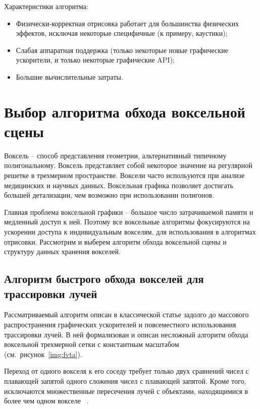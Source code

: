 
Характеристики алгоритма:
\begin{itemize}[label*=---]
     физически-корректной отрисовки не требует больших модификаций алгоритма,
        дополнительных затрат памяти;
    \item Физически-корректная отрисовка работает для большинства физических эффектов,
        исключая некоторые специфичные (к примеру, каустики);
    \item Слабая аппаратная поддержка (только некоторые новые графические ускорители, и только 
        некоторые графические API);
    \item Большие вычислительные затраты.
\end{itemize}

\section{Выбор алгоритма обхода воксельной сцены}

Воксель -- способ представления геометрии, альтернативный типичному
полигональному. Воксель представляет собой некоторое значение на регулярной решетке в 
трехмерном пространстве. Воксели часто испольуются при анализе медицинских и научных
данных. Воксельная графика позволяет достигать большей детализации,
чем возможно при использовании полигонов. 

Главная проблема воксельной графики -- большое число затрачиваемой памяти и медленный доступ к ней.
Поэтому все воксельные алгоритмы фокусируются на ускорении доступа к индивидуальным вокселям, для
использования в алгоритмах отрисовки. Рассмотрим и выберем алгоритм обхода воксельной сцены и 
структуру данных хранения вокселей.

\subsection{Алгоритм быстрого обхода вокселей для трассировки лучей}
Рассматриваемый алгоритм описан в классической статье задолго до массового распространения 
графических ускорителей и повсеместного использования трассировки лучей. В ней формализован 
и описан несложный алгоритм обхода воксельной трехмерной сетки с константным масштабом (см.~рисунок~\ref{img:fvta}).

Переход от одного вокселя к его соседу требует только двух сравнений чисел с плавающей запятой  
одного сложения чисел с плавающей запятой. Кроме того, исключаются множественные пересечения лучей с объектами, находящимися в более чем одном вокселе
~\cite{AFVTAfRT}.

